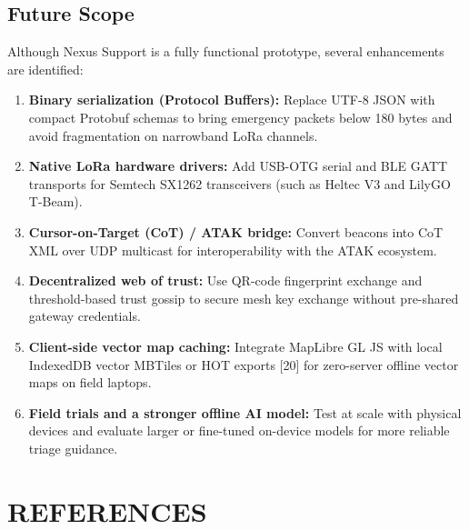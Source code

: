 \documentclass[12pt,a4paper]{report}
\begin{document}
\section{Future Scope}
Although Nexus Support is a fully functional prototype, several enhancements are identified:
\begin{enumerate}
    \item \textbf{Binary serialization (Protocol Buffers):} Replace UTF-8 JSON with compact Protobuf schemas to bring emergency packets below 180 bytes and avoid fragmentation on narrowband LoRa channels.
    \item \textbf{Native LoRa hardware drivers:} Add USB-OTG serial and BLE GATT transports for Semtech SX1262 transceivers (such as Heltec V3 and LilyGO T-Beam).
    \item \textbf{Cursor-on-Target (CoT) / ATAK bridge:} Convert beacons into CoT XML over UDP multicast for interoperability with the ATAK ecosystem.
    \item \textbf{Decentralized web of trust:} Use QR-code fingerprint exchange and threshold-based trust gossip to secure mesh key exchange without pre-shared gateway credentials.
    \item \textbf{Client-side vector map caching:} Integrate MapLibre GL JS with local IndexedDB vector MBTiles or HOT exports [20] for zero-server offline vector maps on field laptops.
    \item \textbf{Field trials and a stronger offline AI model:} Test at scale with physical devices and evaluate larger or fine-tuned on-device models for more reliable triage guidance.
\end{enumerate}

\chapter{REFERENCES}
\end{document}

